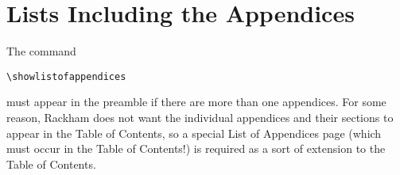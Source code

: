 \documentclass[thesis]{thesis-umich}
\begin{document}
\section{Lists Including the Appendices}
The command
\begin{verbatim}
\showlistofappendices
\end{verbatim}
must appear in the preamble if there are more than one appendices.  For
some reason, Rackham does not want the individual appendices and their
sections to appear in the Table of Contents, so a special List of
Appendices page (which must occur in the Table of Contents!) is required
as a sort of extension to the Table of Contents.

\nocite{*}




\end{document}
